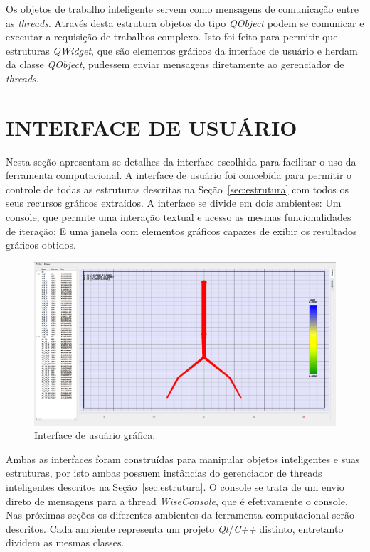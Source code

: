 Os objetos de trabalho inteligente servem como mensagens de comunicação entre as \textit{threads}. Através desta estrutura objetos do tipo \textit{QObject} podem se comunicar e executar a requisição de trabalhos complexo. Isto foi feito para permitir que estruturas \textit{QWidget}, que são elementos gráficos da interface de usuário e herdam da classe \textit{QObject}, pudessem enviar mensagens diretamente ao gerenciador de \textit{threads}.

\section{INTERFACE DE USUÁRIO}\label{sec:userinterface}

Nesta seção apresentam-se detalhes da interface escolhida para facilitar o uso da ferramenta computacional. A interface de usuário foi concebida para permitir o controle de todas as estruturas descritas na Seção~\ref{sec:estrutura} com todos os seus recursos gráficos extraídos. A interface se divide em dois ambientes: Um console, que permite uma interação textual e acesso as mesmas funcionalidades de iteração; E uma janela com elementos gráficos capazes de exibir os resultados gráficos obtidos. 

\begin{figure}[!htbp]
	\centering
	\includegraphics[width=\linewidth]{Figures/IGU_002.png}
	\caption{Interface de usuário gráfica.}
	\label{fig10:UI}
\end{figure}

Ambas as interfaces foram construídas para manipular objetos inteligentes e suas estruturas, por isto ambas possuem instâncias do gerenciador de threads inteligentes descritos na Seção~\ref{sec:estrutura}. O console se trata de um envio direto de mensagens para a thread \textit{WiseConsole}, que é efetivamente o console. Nas próximas seções os diferentes ambientes da ferramenta computacional serão descritos. Cada ambiente representa um projeto \textit{Qt}/\textit{C++} distinto, entretanto dividem as mesmas classes.

